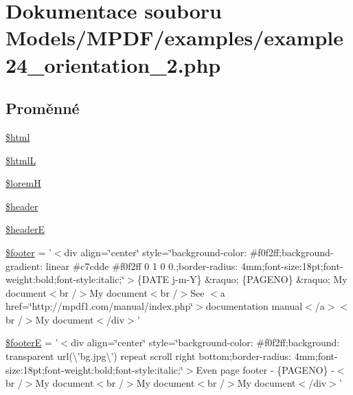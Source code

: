 \hypertarget{example24__orientation__2_8php}{\section{Dokumentace souboru Models/\-M\-P\-D\-F/examples/example24\-\_\-orientation\-\_\-2.php}
\label{example24__orientation__2_8php}
}
\subsection*{Proměnné}
\begin{DoxyCompactItemize}
\item 
\hyperlink{example24__orientation__2_8php_a6f96e7fc92441776c9d1cd3386663b40}{\$html}
\item 
\hyperlink{example24__orientation__2_8php_a3c35d98955ecf26ff4594e9c5a0fa11f}{\$html\-L}
\item 
\hyperlink{example24__orientation__2_8php_afa412b3521b3f79c4a953d445052dc2f}{\$lorem\-H}
\item 
\hyperlink{example24__orientation__2_8php_a4f44601f2b9dc8a1644bce53c94ce622}{\$header}
\item 
\hyperlink{example24__orientation__2_8php_a9fd8be48f713e8db03fa5cee78485f2e}{\$header\-E}
\item 
\hyperlink{example24__orientation__2_8php_abaa4216c852c51c380dd8f10d3cfe944}{\$footer} = '$<$div align=\char`\"{}center\char`\"{} style=\char`\"{}background-\/color\-: \#f0f2ff;background-\/gradient\-: linear \#c7cdde \#f0f2ff 0 1 0 0.;border-\/radius\-: 4mm;font-\/size\-:18pt;font-\/weight\-:bold;font-\/style\-:italic;\char`\"{}$>$\{\-D\-A\-T\-E j-\/m-\/\-Y\} \&raquo; \{\-P\-A\-G\-E\-N\-O\} \&raquo; My document$<$br /$>$\-My document$<$br /$>$\-See $<$a href=\char`\"{}http\-://mpdf1.\-com/manual/index.\-php\char`\"{}$>$documentation manual$<$/a$>$$<$br /$>$\-My document$<$/div$>$'
\item 
\hyperlink{example24__orientation__2_8php_a11a5e15badebbec27b59acdf150c2a63}{\$footer\-E} = '$<$div align=\char`\"{}center\char`\"{} style=\char`\"{}background-\/color\-: \#f0f2ff;background\-: transparent url(\textbackslash{}'bg.\-jpg\textbackslash{}') repeat scroll right bottom;border-\/radius\-: 4mm;font-\/size\-:18pt;font-\/weight\-:bold;font-\/style\-:italic;\char`\"{}$>$\-Even page footer -\/ \{\-P\-A\-G\-E\-N\-O\} -\/$<$br /$>$\-My document$<$br /$>$\-My document$<$br /$>$\-My document$<$/div$>$'
$$
\end{DoxyCompactItemize}
